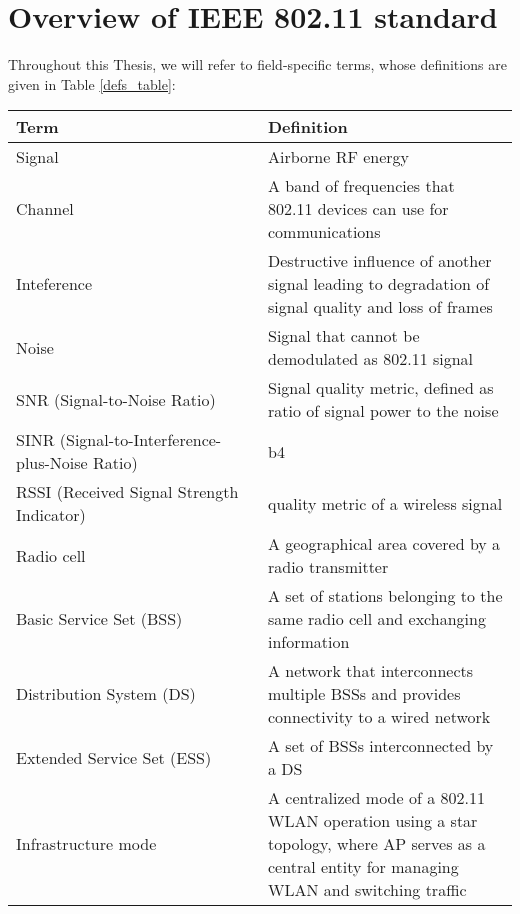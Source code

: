 \section{Overview of IEEE 802.11 standard}

Throughout this Thesis, we will refer to field-specific terms, whose definitions are given in Table \ref{defs_table}:

\makeatletter
\let\@currsize\normalsize
\makeatother
\label{defs_table}
\begin{table}[h]
    \centering
    \begin{tabular}{| p{0.5\linewidth} | p{0.5\linewidth} |}\hline
        \textbf{Term} & \textbf{Definition} \\ \hline
        Signal & Airborne RF energy \\
        \hline
        Channel & A band of frequencies that 802.11 devices can use for communications \cite{AuthoritativeDictionaryIEEE2000} \\
        \hline
        Inteference & Destructive influence of another signal leading to degradation of signal quality and loss of frames \\
        \hline
        Noise & Signal that cannot be demodulated as 802.11 signal \\
        \hline
        SNR (Signal-to-Noise Ratio) & Signal quality metric, defined as ratio of signal power to the noise \\
        \hline
        SINR (Signal-to-Interference-plus-Noise Ratio) & b4 \\
        \hline
        RSSI (Received Signal Strength Indicator) & quality metric of a wireless signal \\
        \hline
        Radio cell & A geographical area covered by a radio transmitter \cite{tanenbaumComputerNetworks2020} \\
        \hline
        Basic Service Set (BSS) & A set of stations belonging to the same radio cell and exchanging information \cite{konsgenSpectrumManagementAlgorithms2010} \\
        \hline
        Distribution System (DS) & A network that interconnects multiple BSSs and provides connectivity to a wired network \cite{konsgenSpectrumManagementAlgorithms2010} \\
        \hline
        Extended Service Set (ESS) & A set of BSSs interconnected by a DS \cite{konsgenSpectrumManagementAlgorithms2010} \\
        \hline
        Infrastructure mode & A centralized mode of a 802.11 WLAN operation using a star topology, where AP serves as a central entity for managing WLAN and switching traffic \\

\end{tabular}
\end{table}
